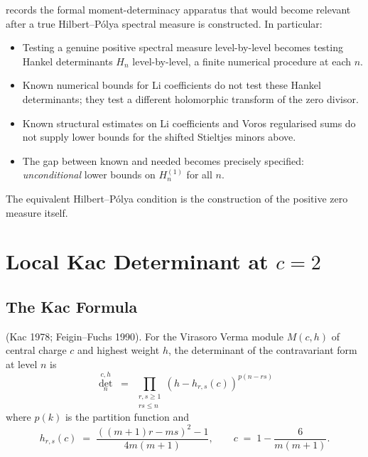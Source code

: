 \begin{remark}
\label{v4-arith:vb:rem:moment-gain}
 records the formal
moment-determinacy apparatus that would become relevant after a true
Hilbert--P\'olya spectral measure is constructed. In particular:
\begin{itemize}
\item Testing a genuine positive spectral measure level-by-level
becomes testing Hankel
determinants \(H_{n}\) level-by-level, a finite numerical procedure at
each \(n\).
\item Known numerical bounds for Li coefficients do not test these
Hankel determinants; they test a different holomorphic transform of the
zero divisor.
\item Known structural estimates on Li coefficients and Voros
regularised sums do not supply lower bounds for the shifted Stieltjes
minors above.
\item The gap between known and needed becomes precisely specified:
\emph{unconditional} lower bounds on \(H_{n}^{(1)}\) for all \(n\).
\end{itemize}
The equivalent Hilbert--P\'olya condition is the construction of the
positive zero measure itself.
\end{remark}

\section{Local Kac Determinant at \(c=2\)}
\label{v4-arith:vb:kac}

\subsection{The Kac Formula}
\label{v4-arith:vb:kac-formula}

\begin{theorem}
\label{v4-arith:vb:thm:kac-formula}
(Kac 1978; Feigin--Fuchs 1990). For the
Virasoro Verma module \(M(c,h)\) of central charge \(c\) and highest
weight \(h\), the determinant of the contravariant form at level \(n\)
is
\begin{equation}
\label{v4-arith:vb:eq:kac-det}
\det_{n}^{c,h}\;=\;\prod_{\substack{r,s\geq 1\\rs\leq n}}(h-h_{r,s}(c))^{p(n-rs)}
\end{equation}
where \(p(k)\) is the partition function and
\begin{equation}
h_{r,s}(c)\;=\;\frac{((m+1)r-ms)^{2}-1}{4m(m+1)},\qquad c\;=\;1-\frac{6}{m(m+1)}.
\end{equation}
\end{theorem}

